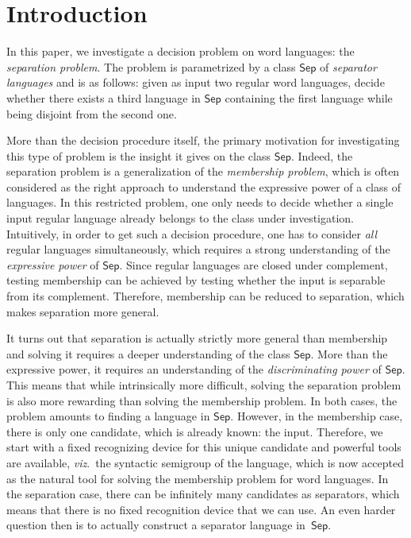 \documentclass{CSML}
\newcommand\Sep{\ensuremath{\mathsf{Sep}}\xspace}
\theoremstyle{plain}
\begin{document}
\section{Introduction}
\label{sec:intro}
In this paper, we investigate a decision problem on word languages:
the \emph{separation problem}. The problem is parametrized by a class
\Sep of \emph{separator languages} and is as follows: given as input
two regular word languages, decide whether there exists a third
language in \Sep containing the first language while being disjoint
from the second one.

More than the decision procedure itself, the primary motivation for
investigating this type of problem is the insight it gives on the class
\Sep. Indeed, the separation problem is a generalization of the
\emph{membership problem}, which is often considered as the right
approach to understand the expressive power of a class of languages.
In this restricted problem, one only needs to decide whether a single
input regular language already belongs to the class  under
investigation. Intuitively, in order to get such a decision procedure,
one has to consider \emph{all} regular languages simultaneously, which
requires a strong understanding of the \emph{expressive power} of
\Sep. Since regular languages are closed under complement, testing
membership can be achieved by testing whether the input is separable
from its complement. Therefore, membership can be reduced to
separation, which makes separation more general.

It turns out that separation is actually strictly more general than
membership and solving it requires a deeper understanding of the class
\Sep. More than the expressive power, it requires an understanding of
the \emph{discriminating power} of \Sep. This means that while
intrinsically more difficult, solving the separation problem is also
more rewarding than solving the membership problem. In both cases, the
problem amounts to finding a language in \Sep. However, in the
membership case, there is only one candidate, which is already known:
the input. Therefore, we start with a fixed recognizing device for
this unique candidate and powerful tools are available,
\emph{viz}.~the syntactic semigroup of the language, which is now
accepted as the natural tool for solving the membership problem for
word languages. In the separation case, there can be infinitely
many candidates as separators, which means that there is no fixed
recognition device that we can use. An even harder question then is to
actually construct a separator language in~\Sep.
\end{document}
